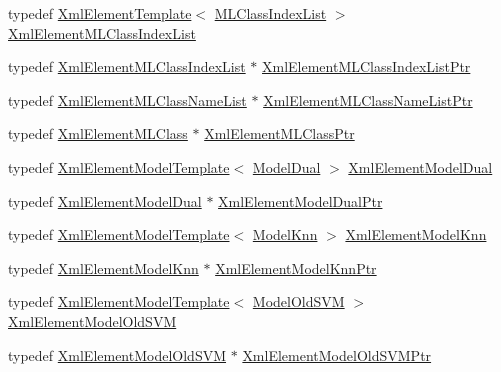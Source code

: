 \begin{DoxyCompactItemize}
typedef \hyperlink{class_k_k_b_1_1_xml_element_template}{Xml\+Element\+Template}$<$ \hyperlink{class_k_k_m_l_l_1_1_m_l_class_index_list}{M\+L\+Class\+Index\+List} $>$ \hyperlink{namespace_k_k_m_l_l_ab6be913329de7423763ce83818e6277c}{Xml\+Element\+M\+L\+Class\+Index\+List}
\item 
typedef \hyperlink{namespace_k_k_m_l_l_ab6be913329de7423763ce83818e6277c}{Xml\+Element\+M\+L\+Class\+Index\+List} $\ast$ \hyperlink{namespace_k_k_m_l_l_a587d3d3b59054794bc2b9c10a11a16dc}{Xml\+Element\+M\+L\+Class\+Index\+List\+Ptr}
\item 
typedef \hyperlink{class_k_k_m_l_l_1_1_xml_element_m_l_class_name_list}{Xml\+Element\+M\+L\+Class\+Name\+List} $\ast$ \hyperlink{namespace_k_k_m_l_l_a22d8eb5a56c122a678ff62dceb9cf66a}{Xml\+Element\+M\+L\+Class\+Name\+List\+Ptr}
\item 
typedef \hyperlink{class_k_k_m_l_l_1_1_xml_element_m_l_class}{Xml\+Element\+M\+L\+Class} $\ast$ \hyperlink{namespace_k_k_m_l_l_a0769bf71221e9eef1e7847bd442b9152}{Xml\+Element\+M\+L\+Class\+Ptr}
\item 
typedef \hyperlink{class_k_k_m_l_l_1_1_xml_element_model_template}{Xml\+Element\+Model\+Template}$<$ \hyperlink{class_k_k_m_l_l_1_1_model_dual}{Model\+Dual} $>$ \hyperlink{namespace_k_k_m_l_l_a1c925e099b1aba977b8a758b1310a815}{Xml\+Element\+Model\+Dual}
\item 
typedef \hyperlink{namespace_k_k_m_l_l_a1c925e099b1aba977b8a758b1310a815}{Xml\+Element\+Model\+Dual} $\ast$ \hyperlink{namespace_k_k_m_l_l_a87b60bb5da92107842fd1d620ab224fd}{Xml\+Element\+Model\+Dual\+Ptr}
\item 
typedef \hyperlink{class_k_k_m_l_l_1_1_xml_element_model_template}{Xml\+Element\+Model\+Template}$<$ \hyperlink{class_k_k_m_l_l_1_1_model_knn}{Model\+Knn} $>$ \hyperlink{namespace_k_k_m_l_l_a7e71fb99af9b98b3c563cfe7e4b07d13}{Xml\+Element\+Model\+Knn}
\item 
typedef \hyperlink{namespace_k_k_m_l_l_a7e71fb99af9b98b3c563cfe7e4b07d13}{Xml\+Element\+Model\+Knn} $\ast$ \hyperlink{namespace_k_k_m_l_l_af358d79ee647829bca0651ce6e0b502c}{Xml\+Element\+Model\+Knn\+Ptr}
\item 
typedef \hyperlink{class_k_k_m_l_l_1_1_xml_element_model_template}{Xml\+Element\+Model\+Template}$<$ \hyperlink{class_k_k_m_l_l_1_1_model_old_s_v_m}{Model\+Old\+S\+VM} $>$ \hyperlink{namespace_k_k_m_l_l_a7e90a26f4dcf446a8c305201aa2b4432}{Xml\+Element\+Model\+Old\+S\+VM}
\item 
typedef \hyperlink{namespace_k_k_m_l_l_a7e90a26f4dcf446a8c305201aa2b4432}{Xml\+Element\+Model\+Old\+S\+VM} $\ast$ \hyperlink{namespace_k_k_m_l_l_a2301fd1414d0b02519f75bcde935a31a}{Xml\+Element\+Model\+Old\+S\+V\+M\+Ptr}

\end{DoxyCompactItemize}
